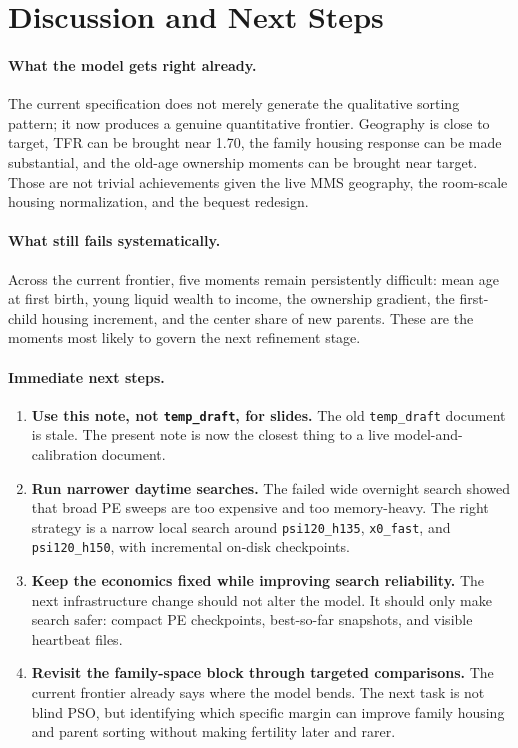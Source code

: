 \documentclass[11pt]{article}
\begin{document}
\section{Discussion and Next Steps}
\label{sec:discussion}

\paragraph{What the model gets right already.} The current specification does not merely generate the qualitative sorting pattern; it now produces a genuine quantitative frontier. Geography is close to target, TFR can be brought near 1.70, the family housing response can be made substantial, and the old-age ownership moments can be brought near target. Those are not trivial achievements given the live MMS geography, the room-scale housing normalization, and the bequest redesign.

\paragraph{What still fails systematically.} Across the current frontier, five moments remain persistently difficult: mean age at first birth, young liquid wealth to income, the ownership gradient, the first-child housing increment, and the center share of new parents. These are the moments most likely to govern the next refinement stage.

\paragraph{Immediate next steps.}
\begin{enumerate}
	\item \textbf{Use this note, not \texttt{temp\_draft}, for slides.} The old \texttt{temp\_draft} document is stale. The present note is now the closest thing to a live model-and-calibration document.

	\item \textbf{Run narrower daytime searches.} The failed wide overnight search showed that broad PE sweeps are too expensive and too memory-heavy. The right strategy is a narrow local search around \texttt{psi120\_h135}, \texttt{x0\_fast}, and \texttt{psi120\_h150}, with incremental on-disk checkpoints.

	\item \textbf{Keep the economics fixed while improving search reliability.} The next infrastructure change should not alter the model. It should only make search safer: compact PE checkpoints, best-so-far snapshots, and visible heartbeat files.

	\item \textbf{Revisit the family-space block through targeted comparisons.} The current frontier already says where the model bends. The next task is not blind PSO, but identifying which specific margin can improve family housing and parent sorting without making fertility later and rarer.
\end{enumerate}
\end{document}
